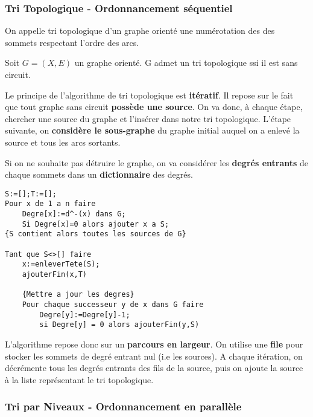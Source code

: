 \subsubsection{Tri Topologique - Ordonnancement séquentiel}

\begin{definition}
    On appelle tri topologique d'un graphe orienté une numérotation des des sommets respectant l'ordre des arcs. 
\end{definition}

\begin{theorem}
    Soit $G = (X,E)$ un graphe orienté. G admet un tri topologique ssi il est sans circuit. 
\end{theorem}

Le principe de l'algorithme de tri topologique est \textbf{itératif}. 
Il repose sur le fait que tout graphe sans circuit \textbf{possède une source}. 
On va donc, à chaque étape, chercher une source du graphe et l'insérer dans notre tri topologique. 
L'étape suivante, on \textbf{considère le sous-graphe} du graphe initial auquel on a enlevé la source et tous les 
arcs sortants. 

Si on ne souhaite pas détruire le graphe, on va considérer les \textbf{degrés entrants} de chaque sommets dans un \textbf{dictionnaire} des degrés.

\begin{lstlisting}
S:=[];T:=[];
Pour x de 1 a n faire
    Degre[x]:=d^-(x) dans G;
    Si Degre[x]=0 alors ajouter x a S;
{S contient alors toutes les sources de G}

Tant que S<>[] faire
    x:=enleverTete(S);
    ajouterFin(x,T)

    {Mettre a jour les degres}
    Pour chaque successeur y de x dans G faire
        Degre[y]:=Degre[y]-1;
        si Degre[y] = 0 alors ajouterFin(y,S)
\end{lstlisting}

L'algorithme repose donc sur un \textbf{parcours en largeur}. On utilise une \textbf{file} pour stocker les 
sommets de degré entrant nul (i.e les sources). A chaque itération, on décrémente tous les degrés entrants des fils de la source, 
puis on ajoute la source à la liste représentant le tri topologique. 


\subsubsection{Tri par Niveaux - Ordonnancement en parallèle}

